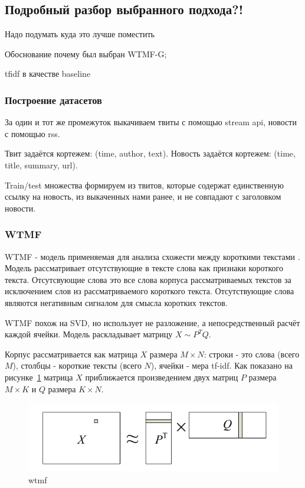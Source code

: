 \subsection{Подробный разбор выбранного подхода?!}
    Надо подумать куда это лучше поместить



        Обоснование почему был выбран WTMF-G;

        tfidf в качестве baseline

    \subsubsection{Построение датасетов}
        За один и тот же промежуток выкачиваем твиты с помощью stream api, новости с помощью rss.

        Твит задаётся кортежем: (time, author, text). Новость задаётся кортежем: (time, title, summary, url).

        Train/test множества формируем из твитов, которые содержат единственную ссылку на новость, из выкаченных нами ранее, и не совпадают с заголовком новости.

    \subsubsection{WTMF}
        WTMF - модель применяемая для анализа схожести между короткими текстами \cite{wtmf}. Модель рассматривает отсутствующие в тексте слова как признаки короткого текста. Отсутсвующие слова это все слова корпуса рассматриваемых текстов за исключением слов из рассматриваемого короткого текста. Отсутствующие слова являются негативным сигналом для смысла коротких текстов.

        WTMF похож на SVD, но использует не разложение, а непосредственный расчёт каждой ячейки. Модель раскладывает матрицу $X \sim P^TQ$.

        Корпус рассматривается как матрица $X$ размера $M \times N$: строки - это слова (всего $M$), столбцы - короткие тексты (всего $N$), ячейки - мера tf-idf.
        Как показано на рисунке~\ref{pic:wtmf} матрица $X$ приближается произведением двух матриц $P$ размера $M \times K$ и $Q$ размера $K \times N$.

        \begin{figure}[h!]
            \center
            \includegraphics[scale=0.45]{wtmf.png}
            \caption{wtmf}
            \label{pic:wtmf}
        \end{figure}

